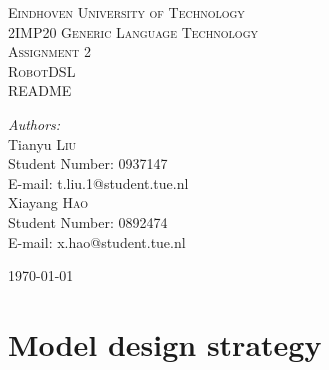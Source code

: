 \documentclass[a4paper, 11pt]{article}
\begin{document}
\begin{titlepage}
    \newcommand{\HRule}{\rule{\linewidth}{0.5mm}} %
    \centering
    \textsc{\LARGE Eindhoven University of Technology}\\[1.5cm]
    \textsc{\Large 2IMP20 Generic Language Technology}\\[1.5cm]
    \textsc{\large Assignment 2}\\
    \textsc{\large RobotDSL}\\[2cm]
    \textsc{\Large README}\\[3cm]
    \begin{minipage}{0.5\textwidth}
        \begin{flushleft} \large
            \emph{Authors:}\\ [0.5cm]
            Tianyu \textsc{Liu}\\
            Student Number: 0937147\\
            E-mail: t.liu.1@student.tue.nl\\ [0.2cm]
            Xiayang \textsc{Hao}\\
            Student Number: 0892474\\
            E-mail: x.hao@student.tue.nl\\ [0.2cm]
        \end{flushleft}
    \end{minipage}
    
    \vspace{15ex}
    {\large \today}\\[3cm] %
    \vfill
\end{titlepage}

\setcounter{page}{1} 


\newpage 


\section{Model design strategy}
\end{document}
